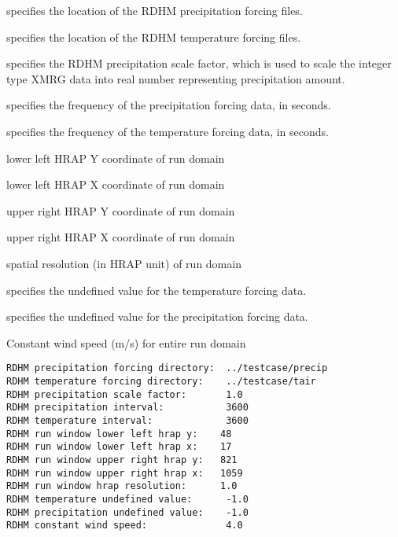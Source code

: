  
  specifies the location
 of the RDHM precipitation forcing files.

  specifies the location
 of the RDHM temperature forcing files.

  specifies the RDHM
 precipitation scale factor, which is used to scale the integer 
 type XMRG data into real number representing precipitation amount. 

  specifies the frequency of
 the precipitation forcing data, in seconds.

  specifies the frequency of the
 temperature forcing data, in seconds.

  lower left HRAP Y coordinate of run domain

  lower left HRAP X coordinate of run domain

  upper right HRAP Y coordinate of run domain

  upper right HRAP X coordinate of run domain 

  spatial resolution (in HRAP unit) of run domain 

  specifies the undefined
 value for the temperature forcing data.

  specifies the
 undefined value for the precipitation forcing data.

  Constant wind speed (m/s) for entire run domain  
 

 \begin{Verbatim}[frame=single]
RDHM precipitation forcing directory:  ../testcase/precip
RDHM temperature forcing directory:    ../testcase/tair
RDHM precipitation scale factor:       1.0
RDHM precipitation interval:           3600
RDHM temperature interval:             3600
RDHM run window lower left hrap y:    48
RDHM run window lower left hrap x:    17
RDHM run window upper right hrap y:   821
RDHM run window upper right hrap x:   1059
RDHM run window hrap resolution:      1.0
RDHM temperature undefined value:      -1.0
RDHM precipitation undefined value:    -1.0
RDHM constant wind speed:              4.0
 \end{Verbatim}

